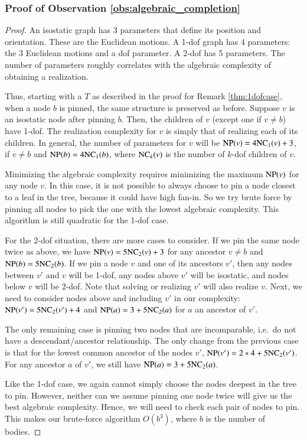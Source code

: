 \subsubsection{Proof of Observation \ref{obs:algebraic_completion}}
\begin{proof}
    An isostatic graph has 3 parameters that define its position and orientation. These are the Euclidean motions. A 1-dof graph has 4 parameters: the 3 Euclidean motions and a dof parameter. A 2-dof has 5 parameters. The number of parameters roughly correlates with the algebraic complexity of obtaining a realization.

    Thus, starting with a $T$ as described in the proof for Remark \ref{thm:1dofcase}, when a node $b$ is pinned, the same structure is preserved as before. Suppose  $v$ is an isostatic node after pinning $b$. Then, the children of $v$ (except one if $v \neq b$) have 1-dof. The realization complexity for $v$ is simply that of realizing each of its children. In general, the number of parameters for $v$ will be $\textsc{NP}(v) = 4\textsc{NC}_{1}(v)+3$, if $v \neq b$ and $\textsc{NP}(b) = 4\textsc{NC}_{1}(b)$, where $\textsc{NC}_{k}(v)$ is the number of $k$-dof children of $v$.

    Minimizing the algebraic complexity requires minimizing the maximum $\textsc{NP}(v)$ for any node $v$. In this case, it is not possible to always choose to pin a node closest to a leaf in the tree, because it could have high fan-in. So we try brute force by pinning all nodes to  pick the one with the lowest algebraic complexity. This algorithm is still quadratic for the 1-dof case.

    For the 2-dof situation, there are more cases to consider. If we pin the same node twice as above, we have $\textsc{NP}(v) = 5\textsc{NC}_{2}(v)+3$ for any ancestor $v \neq b$ and $\textsc{NP}(b) = 5\textsc{NC}_{2}(b)$. If we pin a node $v$ and one of its ancestors $v'$, then any nodes between $v'$ and $v$ will be 1-dof, any nodes above $v'$ will be isostatic, and nodes below $v$ will be 2-dof. Note that solving or realizing $v'$ will also realize $v$.  Next, we need to consider nodes above and including $v'$ in our complexity: $\textsc{NP}(v') = 5\textsc{NC}_{2}(v') + 4$ and $\textsc{NP}(a) = 3 + 5\textsc{NC}_{2}(a)$ for $a$ an ancestor of $v'$.

    The only remaining case is pinning two nodes that are incomparable, i.e.\ do not have a descendant/ancestor relationship. The only change from the previous case is that for the lowest common ancestor of the nodes $v'$, $\textsc{NP}(v') = 2*4+5\textsc{NC}_{2}(v')$. For any ancestor $a$ of $v'$, we still have $\textsc{NP}(a) = 3 + 5\textsc{NC}_{2}(a)$.

    Like the 1-dof case, we again cannot simply choose the nodes deepest in the tree to pin. However, neither can we assume pinning one node twice will give us the best algebraic complexity. Hence, we will need to check each pair of nodes to pin. This makes our brute-force algorithm $O(b^3)$, where $b$ is the number of bodies.
\end{proof}

